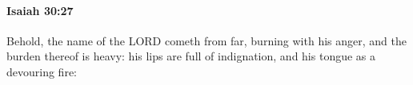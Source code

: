 
		\paragraph{Isaiah 30:27} %
			\label{ISAIAH-30-27}

			Behold, the name of the LORD cometh from far, burning with his anger, and the burden thereof is heavy: his lips are full of indignation, and his tongue as a devouring fire:


